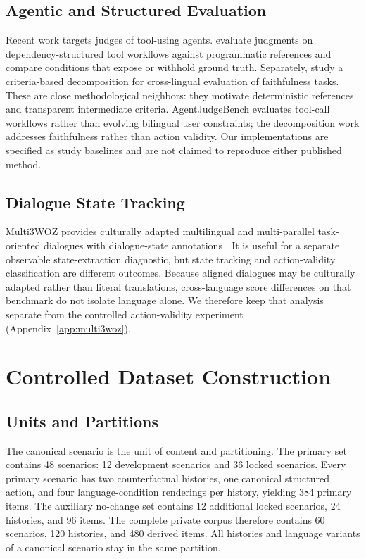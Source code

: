\documentclass[11pt]{article}
\begin{document}
\subsection{Agentic and Structured Evaluation}
Recent work targets judges of tool-using agents. \citet{verma-etal-2026-agentjudgebench} evaluate judgments on dependency-structured tool workflows against programmatic references and compare conditions that expose or withhold ground truth. Separately, \citet{sheth-etal-2026-cross} study a criteria-based decomposition for cross-lingual evaluation of faithfulness tasks. These are close methodological neighbors: they motivate deterministic references and transparent intermediate criteria. AgentJudgeBench evaluates tool-call workflows rather than evolving bilingual user constraints; the decomposition work addresses faithfulness rather than action validity. Our implementations are specified as study baselines and are not claimed to reproduce either published method.

\subsection{Dialogue State Tracking}
Multi3WOZ provides culturally adapted multilingual and multi-parallel task-oriented dialogues with dialogue-state annotations \citep{hu-etal-2023-multi3}. It is useful for a separate observable state-extraction diagnostic, but state tracking and action-validity classification are different outcomes. Because aligned dialogues may be culturally adapted rather than literal translations, cross-language score differences on that benchmark do not isolate language alone. We therefore keep that analysis separate from the controlled action-validity experiment (Appendix~\ref{app:multi3woz}).

\section{Controlled Dataset Construction}
\subsection{Units and Partitions}
The canonical scenario is the unit of content and partitioning. The primary set contains 48 scenarios: 12 development scenarios and 36 locked scenarios. Every primary scenario has two counterfactual histories, one canonical structured action, and four language-condition renderings per history, yielding 384 primary items. The auxiliary no-change set contains 12 additional locked scenarios, 24 histories, and 96 items. The complete private corpus therefore contains 60 scenarios, 120 histories, and 480 derived items. All histories and language variants of a canonical scenario stay in the same partition.
\end{document}
